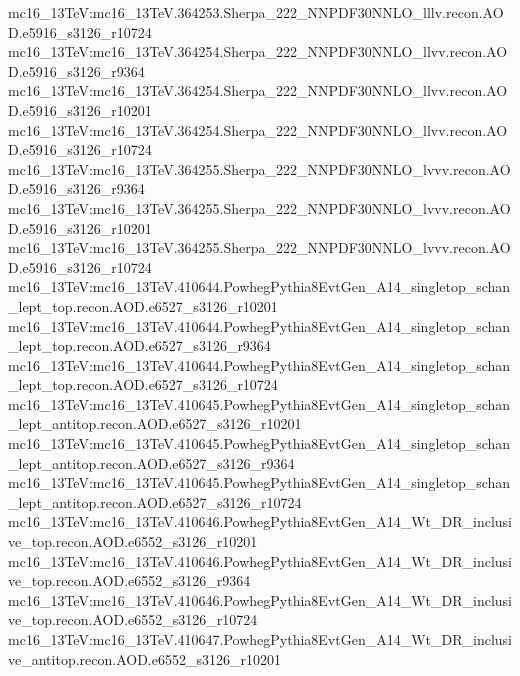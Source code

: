 { mc16\_13TeV:mc16\_13TeV.364253.Sherpa\_222\_NNPDF30NNLO\_lllv.recon.AOD.e5916\_s3126\_r10724\newline    
 mc16\_13TeV:mc16\_13TeV.364254.Sherpa\_222\_NNPDF30NNLO\_llvv.recon.AOD.e5916\_s3126\_r9364\newline    
 mc16\_13TeV:mc16\_13TeV.364254.Sherpa\_222\_NNPDF30NNLO\_llvv.recon.AOD.e5916\_s3126\_r10201\newline    
 mc16\_13TeV:mc16\_13TeV.364254.Sherpa\_222\_NNPDF30NNLO\_llvv.recon.AOD.e5916\_s3126\_r10724\newline    
 mc16\_13TeV:mc16\_13TeV.364255.Sherpa\_222\_NNPDF30NNLO\_lvvv.recon.AOD.e5916\_s3126\_r9364\newline    
 mc16\_13TeV:mc16\_13TeV.364255.Sherpa\_222\_NNPDF30NNLO\_lvvv.recon.AOD.e5916\_s3126\_r10201\newline    
 mc16\_13TeV:mc16\_13TeV.364255.Sherpa\_222\_NNPDF30NNLO\_lvvv.recon.AOD.e5916\_s3126\_r10724\newline    
 mc16\_13TeV:mc16\_13TeV.410644.PowhegPythia8EvtGen\_A14\_singletop\_schan\_lept\_top.recon.AOD.e6527\_s3126\_r10201\newline    
 mc16\_13TeV:mc16\_13TeV.410644.PowhegPythia8EvtGen\_A14\_singletop\_schan\_lept\_top.recon.AOD.e6527\_s3126\_r9364\newline    
 mc16\_13TeV:mc16\_13TeV.410644.PowhegPythia8EvtGen\_A14\_singletop\_schan\_lept\_top.recon.AOD.e6527\_s3126\_r10724\newline    
 mc16\_13TeV:mc16\_13TeV.410645.PowhegPythia8EvtGen\_A14\_singletop\_schan\_lept\_antitop.recon.AOD.e6527\_s3126\_r10201\newline    
 mc16\_13TeV:mc16\_13TeV.410645.PowhegPythia8EvtGen\_A14\_singletop\_schan\_lept\_antitop.recon.AOD.e6527\_s3126\_r9364\newline    
 mc16\_13TeV:mc16\_13TeV.410645.PowhegPythia8EvtGen\_A14\_singletop\_schan\_lept\_antitop.recon.AOD.e6527\_s3126\_r10724\newline   
 mc16\_13TeV:mc16\_13TeV.410646.PowhegPythia8EvtGen\_A14\_Wt\_DR\_inclusive\_top.recon.AOD.e6552\_s3126\_r10201\newline    
 mc16\_13TeV:mc16\_13TeV.410646.PowhegPythia8EvtGen\_A14\_Wt\_DR\_inclusive\_top.recon.AOD.e6552\_s3126\_r9364\newline    
 mc16\_13TeV:mc16\_13TeV.410646.PowhegPythia8EvtGen\_A14\_Wt\_DR\_inclusive\_top.recon.AOD.e6552\_s3126\_r10724\newline    
 mc16\_13TeV:mc16\_13TeV.410647.PowhegPythia8EvtGen\_A14\_Wt\_DR\_inclusive\_antitop.recon.AOD.e6552\_s3126\_r10201\newline    
}

